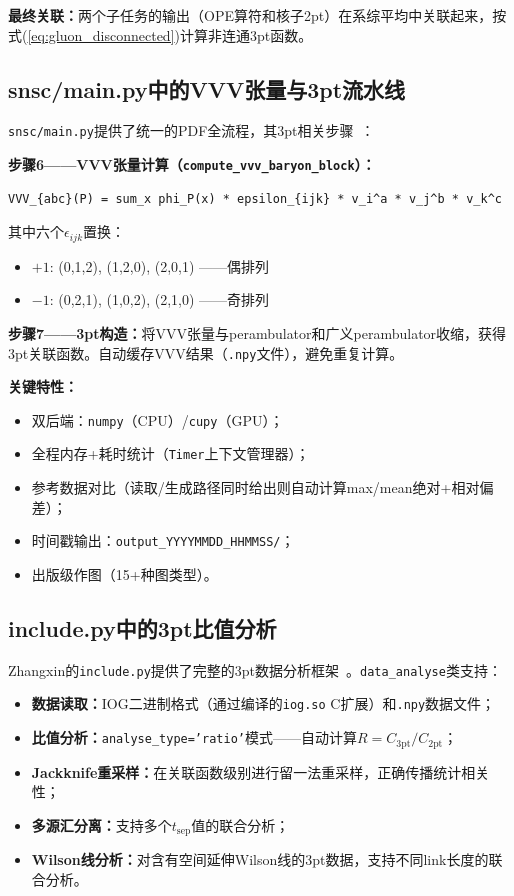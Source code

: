 \documentclass[12pt,a4paper]{ctexart}
\theoremstyle{definition}
\begin{document}
\textbf{最终关联：}两个子任务的输出（OPE算符和核子2pt）在系综平均中关联起来，按式(\ref{eq:gluon_disconnected})计算非连通3pt函数。

\subsection{snsc/main.py中的VVV张量与3pt流水线}

\texttt{snsc/main.py}提供了统一的PDF全流程，其3pt相关步骤~\cite{snscMain2026}：

\textbf{步骤6——VVV张量计算（\texttt{compute\_vvv\_baryon\_block}）：}
\begin{verbatim}
VVV_{abc}(P) = sum_x phi_P(x) * epsilon_{ijk} * v_i^a * v_j^b * v_k^c
\end{verbatim}
其中六个$\epsilon_{ijk}$置换：
\begin{itemize}
    \item $+1$: (0,1,2), (1,2,0), (2,0,1) ——偶排列
    \item $-1$: (0,2,1), (1,0,2), (2,1,0) ——奇排列
\end{itemize}

\textbf{步骤7——3pt构造：}将VVV张量与perambulator和广义perambulator收缩，获得3pt关联函数。自动缓存VVV结果（\texttt{.npy}文件），避免重复计算。

\textbf{关键特性：}
\begin{itemize}[leftmargin=*]
    \item 双后端：\texttt{numpy}（CPU）/\texttt{cupy}（GPU）；
    \item 全程内存+耗时统计（\texttt{Timer}上下文管理器）；
    \item 参考数据对比（读取/生成路径同时给出则自动计算max/mean绝对+相对偏差）；
    \item 时间戳输出：\texttt{output\_YYYYMMDD\_HHMMSS/}；
    \item 出版级作图（15+种图类型）。
\end{itemize}

\subsection{include.py中的3pt比值分析}

Zhangxin的\texttt{include.py}提供了完整的3pt数据分析框架~\cite{include2026}。\texttt{data\_analyse}类支持：

\begin{itemize}[leftmargin=*]
    \item \textbf{数据读取：}IOG二进制格式（通过编译的\texttt{iog.so} C扩展）和\texttt{.npy}数据文件；
    \item \textbf{比值分析：}\texttt{analyse\_type='ratio'}模式——自动计算$R = C_{3\text{pt}} / C_{2\text{pt}}$；
    \item \textbf{Jackknife重采样：}在关联函数级别进行留一法重采样，正确传播统计相关性；
    \item \textbf{多源汇分离：}支持多个$t_{\text{sep}}$值的联合分析；
    \item \textbf{Wilson线分析：}对含有空间延伸Wilson线的3pt数据，支持不同link长度的联合分析。
\end{itemize}
\end{document}
